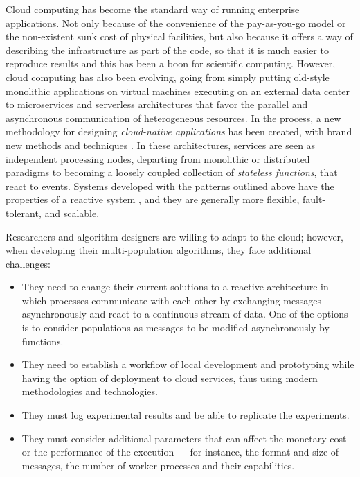 \documentclass[review]{elsarticle}
\begin{document}
Cloud computing has become the standard way of running
enterprise applications.  Not only because of the convenience of the
pay-as-you-go model or the non-existent sunk cost of physical facilities, but also because
it offers a way of describing the infrastructure as part of the code, so that it
is much easier to reproduce results and this has been a boon for scientific
computing.
However,  cloud computing has also been evolving, going from simply
putting old-style monolithic applications on virtual machines executing on an external 
data center to microservices \cite{microservices} and serverless architectures \cite{varghese2018next,Varghese2018849} 
that favor the parallel and asynchronous communication of
heterogeneous resources. In the process, a new methodology for designing 
{\em cloud-native applications} has been created, with brand new methods and
techniques \cite{Baldini2016287}. 
In these architectures, services are seen as independent processing nodes, 
departing from monolithic or distributed paradigms to becoming a loosely 
coupled collection of {\em
stateless functions}\cite{malawski2017serverless}, that react to events. 
Systems developed with the patterns outlined above have the
properties of a reactive system \cite{boner2014reactive}, and they are generally 
more flexible, fault-tolerant, and scalable. %

Researchers and algorithm designers are willing to adapt to the cloud; 
however, when developing their multi-population algorithms, they face additional challenges:

\begin{itemize}
    \item They need to change their current solutions to a reactive architecture in which processes
    communicate with each other by exchanging messages asynchronously and react
    to a continuous stream of data. One of the options is to consider
    populations as messages to be modified asynchronously by functions. 


    \item They need to establish a workflow of local development and
prototyping while having the option of deployment to cloud services,
 thus using modern methodologies and technologies.

    \item They must log experimental results and be able to replicate the experiments. 

    \item They must consider additional parameters that can affect the monetary cost 
    or the performance of the
    execution — for instance, the format and size of messages, the number of
    worker processes and their capabilities.  
\end{itemize}
\end{document}
